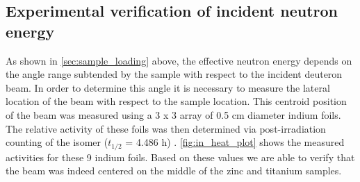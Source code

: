 \documentclass[5p]{elsarticle}
\begin{document}



\subsection{Experimental verification of incident neutron energy}\label{sec:lee_sec}

As shown in \autoref{sec:sample_loading} above, the effective neutron energy depends on the angle range subtended by the sample with respect to the incident deuteron beam.
 In order to determine this angle it is necessary to measure the lateral location of the beam with respect to the sample location.
 This centroid position of the beam was measured using a 3 x 3 array of 0.5 cm diameter indium foils.
 The relative activity of these foils was then determined via post-irradiation counting of the  isomer ($t_{1/2}$ = 4.486 h) \cite{Blachot2012}.
 \autoref{fig:in_heat_plot}  shows the measured activities for these 9 indium foils.
 Based on these values we are able to verify that the beam was indeed centered on the middle of the zinc and titanium samples.
  
\end{document}
